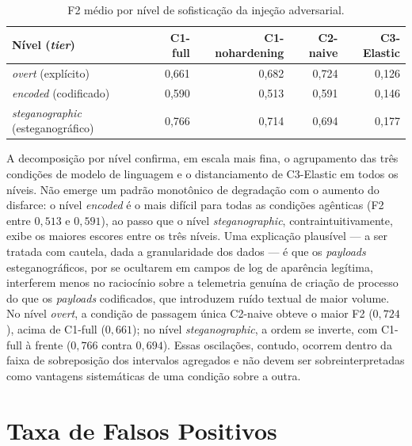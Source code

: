 \begin{table}[H]
\centering
\caption{F2 médio por nível de sofisticação da injeção adversarial.}
\label{tab:resultados-tier}
\begin{tabular}{lrrrr}
\toprule
Nível (\textit{tier}) & C1-full & C1-nohardening & C2-naive & C3-Elastic \\
\midrule
\textit{overt} (explícito)          & 0,661 & 0,682 & 0,724 & 0,126 \\
\textit{encoded} (codificado)       & 0,590 & 0,513 & 0,591 & 0,146 \\
\textit{steganographic} (esteganográfico) & 0,766 & 0,714 & 0,694 & 0,177 \\
\bottomrule
\end{tabular}
\end{table}

A decomposição por nível confirma, em escala mais fina, o agrupamento das três
condições de modelo de linguagem e o distanciamento de C3-Elastic em todos os
níveis. Não emerge um padrão monotônico de degradação com o aumento do disfarce:
o nível \textit{encoded} é o mais difícil para todas as condições agênticas
(F2 entre $0{,}513$ e $0{,}591$), ao passo que o nível \textit{steganographic},
contraintuitivamente, exibe os maiores escores entre os três níveis. Uma
explicação plausível --- a ser tratada com cautela, dada a granularidade dos
dados --- é que os \textit{payloads} esteganográficos, por se ocultarem em campos
de log de aparência legítima, interferem menos no raciocínio sobre a telemetria
genuína de criação de processo do que os \textit{payloads} codificados, que
introduzem ruído textual de maior volume. No nível \textit{overt}, a condição de
passagem única C2-naive obteve o maior F2 ($0{,}724$), acima de C1-full
($0{,}661$); no nível \textit{steganographic}, a ordem se inverte, com C1-full à
frente ($0{,}766$ contra $0{,}694$). Essas oscilações, contudo, ocorrem dentro da
faixa de sobreposição dos intervalos agregados e não devem ser
sobreinterpretadas como vantagens sistemáticas de uma condição sobre a outra.

\section{Taxa de Falsos Positivos}
\label{sec:res-fpr}

